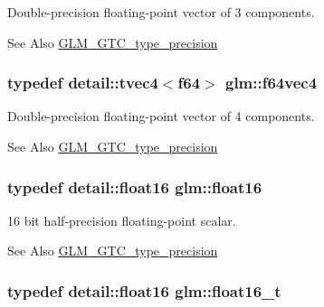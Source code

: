 Double-\/precision floating-\/point vector of 3 components. 

\begin{DoxySeeAlso}{See Also}
\hyperlink{group__gtc__type__precision}{G\-L\-M\-\_\-\-G\-T\-C\-\_\-type\-\_\-precision} 
\end{DoxySeeAlso}
\hypertarget{group__gtc__type__precision_ga5032a5abd2c2a1f18927c9eeef088c7b}{
\subsubsection[{f64vec4}]{\setlength{\rightskip}{0pt plus 5cm}typedef detail\-::tvec4$<$f64$>$ {\bf glm\-::f64vec4}}}\label{group__gtc__type__precision_ga5032a5abd2c2a1f18927c9eeef088c7b}


Double-\/precision floating-\/point vector of 4 components. 

\begin{DoxySeeAlso}{See Also}
\hyperlink{group__gtc__type__precision}{G\-L\-M\-\_\-\-G\-T\-C\-\_\-type\-\_\-precision} 
\end{DoxySeeAlso}
\hypertarget{group__gtc__type__precision_ga50c577688ec4cbdb3dfafb8e8155c82f}{
\subsubsection[{float16}]{\setlength{\rightskip}{0pt plus 5cm}typedef detail\-::float16 {\bf glm\-::float16}}}\label{group__gtc__type__precision_ga50c577688ec4cbdb3dfafb8e8155c82f}


16 bit half-\/precision floating-\/point scalar. 

\begin{DoxySeeAlso}{See Also}
\hyperlink{group__gtc__type__precision}{G\-L\-M\-\_\-\-G\-T\-C\-\_\-type\-\_\-precision} 
\end{DoxySeeAlso}
\hypertarget{group__gtc__type__precision_ga7dd9d64b24117690e47631d07f08a207}{
\subsubsection[{float16\-\_\-t}]{\setlength{\rightskip}{0pt plus 5cm}typedef detail\-::float16 {\bf glm\-::float16\-\_\-t}}}\label{group__gtc__type__precision_ga7dd9d64b24117690e47631d07f08a207}



